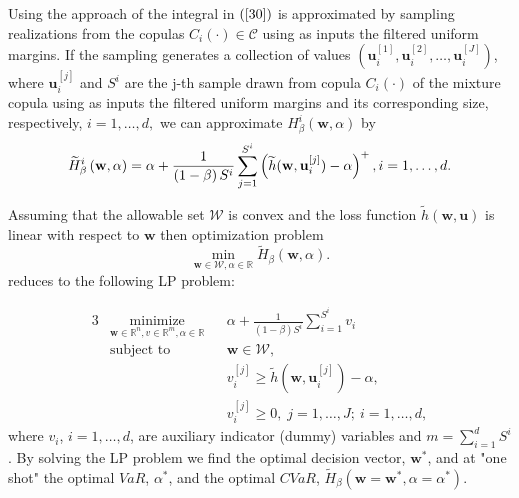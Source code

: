 \documentclass[a4paper,10pt]{article}
\begin{document}
Using the approach of \citet*{rockafellar2000} the integral in $\left( \ref{30}\right) $ is approximated by sampling realizations from the copulas $C_{i}\left( \cdot \right) \in \mathcal{C}$ using as inputs the filtered uniform margins. If the sampling generates a collection of values $\left(\mathbf{u}_{i}^{[1]},\mathbf{u}_{i}^{[2]},\ldots,\mathbf{u}_{i}^{[J]}\right)$,
where $\mathbf{u}_{i}^{[j]}$ and $S^{i}$ are the j-th sample drawn from copula $C_{i}\left( \cdot \right) $ of the mixture copula using as inputs the filtered uniform margins and its corresponding size, respectively, $i=1,\ldots,d,$ we can approximate $H_{\beta }^{i}\left( \mathbf{w},\alpha\right)$ by
\begin{equation}
\widetilde{H}_{\beta }^{i}\left( \mathbf{w},\alpha \right) =\alpha +\frac{1}{%
	\left( 1-\beta \right) S^{i}}\sum_{j=1}^{S^{i}}\left( \widetilde{h}(\mathbf{w},\mathbf{u}%
_{i}^{[j]})-\alpha \right) ^{+},i=1,\ldots,d.
\end{equation}%

Assuming that the allowable set $\mathcal{W}$ is convex and the loss function $\widetilde{h}\left( \mathbf{w,u}\right) $ is linear with respect to $\mathbf{w}$ then optimization problem
\begin{equation}
\underset{\mathbf{w}\in \mathcal{W},\alpha \in
	\mathbb{R}
}{\min }\widetilde{H}_{\beta }\left( \mathbf{w},\alpha \right) .
\end{equation}%
reduces to the following LP problem:

\begin{alignat}{3}
& \underset{\mathbf{w}\in
	\mathbb{R}^{n},v\in
	\mathbb{R}^{m},\alpha \in
	\mathbb{R}}{\text{minimize}}
& & \alpha +\frac{1}{\left( 1-\beta \right)  S^{i}}\sum_{i=1}^{S^{i}}v_{i}
\\ 
& \text{subject to} 
& & \mathbf{w}\in \mathcal{W},\\
&&& v_{i}^{\left[ j\right] }\geq \widetilde{h}(\mathbf{w},\mathbf{u}_{i}^{[j]})-\alpha , \\
&&&v_{i}^{\left[ j\right] }\geq 0, \; j = 1, \ldots, J; \ i = 1, \ldots, d,
\end{alignat}
where $v_{i}$, $i = 1, \ldots, d$, are auxiliary indicator (dummy) variables and $m=\sum_{i=1}^{d}S^{i}$. By solving the LP problem we find the optimal decision vector, $\mathbf{w}^{\ast }$, and at "one shot" the optimal $VaR$, $\alpha ^{\ast }$, and the optimal $CVaR$, $\widetilde{H}_{\beta }\left(\mathbf{w}=\mathbf{w}^{\ast },\alpha =\alpha ^{\ast }\right) $.

\end{document}
